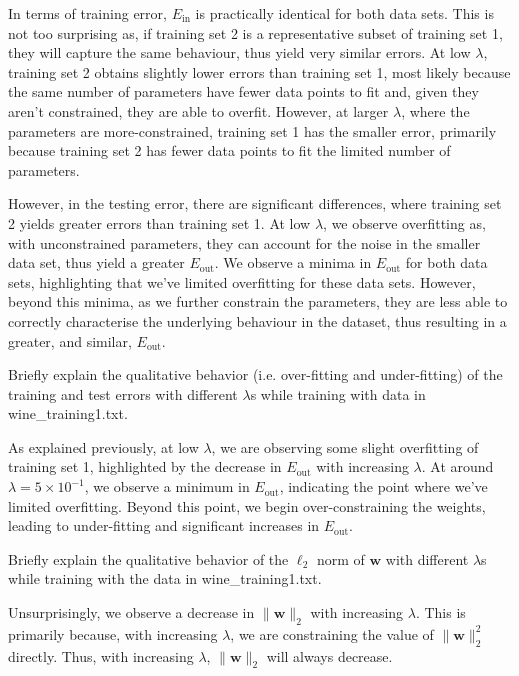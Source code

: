 \begin{solution}
 In terms of training error, $E_\text{in}$ is practically identical for both data sets. This is not too surprising as, if training set 2 is a representative subset of training set 1, they will capture the same behaviour, thus yield very similar errors. At low $\lambda$, training set 2 obtains slightly lower errors than training set 1, most likely because the same number of parameters have fewer data points to fit and, given they aren't constrained, they are able to overfit. However, at larger $\lambda$, where the parameters are more-constrained, training set 1 has the smaller error, primarily because training set 2 has fewer data points to fit the limited number of parameters.

 However, in the testing error, there are significant differences, where training set 2 yields greater errors than training set 1. At low $\lambda$, we observe overfitting as, with unconstrained parameters, they can account for the noise in the smaller data set, thus yield a greater $E_\text{out}$. We observe a minima in $E_\text{out}$ for both data sets, highlighting that we've limited overfitting for these data sets. However, beyond this minima, as we further constrain the parameters, they are less able to correctly characterise the underlying behaviour in the dataset, thus resulting in a greater, and similar, $E_\text{out}$.
\end{solution}

\problem[4]
Briefly explain the qualitative behavior (i.e. over-fitting and under-fitting) of the training and test errors with different $\lambda$s while training with data in wine\_training1.txt.

\begin{solution}
 As explained previously, at low $\lambda$, we are observing some slight overfitting of training set 1, highlighted by the decrease in $E_\text{out}$ with increasing $\lambda$. At around $\lambda=5\times 10^{-1}$, we observe a minimum in $E_\text{out}$, indicating the point where we've limited overfitting. Beyond this point, we begin over-constraining the weights, leading to under-fitting and significant increases in $E_\text{out}$.
\end{solution}

\problem[4]
Briefly explain the qualitative behavior of the $\ell_2$ norm of $\textbf{w}$ with different $\lambda$s while training with the data in wine\_training1.txt.

\begin{solution}
   Unsurprisingly, we observe a decrease in $\|\mathbf{w}\|_2$ with increasing $\lambda$. This is primarily because, with increasing $\lambda$, we are constraining the value of $\|\mathbf{w}\|_2^2$ directly. Thus, with increasing $\lambda$, $\|\mathbf{w}\|_2$ will always decrease.
\end{solution}

